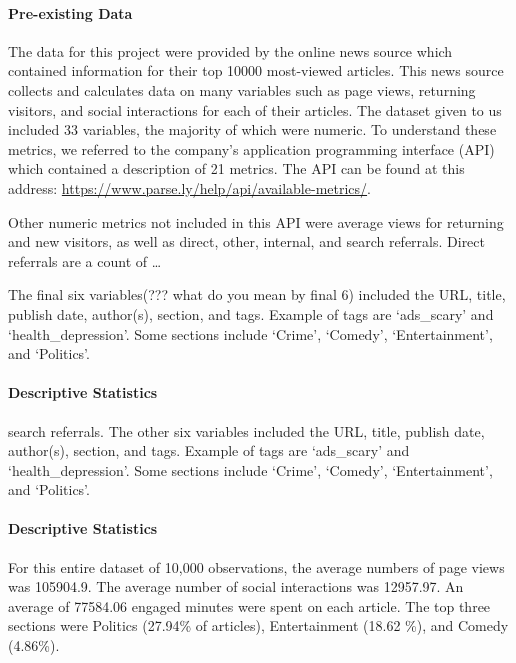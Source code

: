 \documentclass[10pt,letterpaper]{article}
\begin{document}
\hypertarget{pre-existing-data}{%
\paragraph{Pre-existing Data}\label{pre-existing-data}}

The data for this project were provided by the online news source which
contained information for their top 10000 most-viewed articles. This
news source collects and calculates data on many variables such as page
views, returning visitors, and social interactions for each of their
articles. The dataset given to us included 33 variables, the majority of
which were numeric. To understand these metrics, we referred to the
company's application programming interface (API) which contained a
description of 21 metrics. The API can be found at this address:
\url{https://www.parse.ly/help/api/available-metrics/}.

Other numeric metrics not included in this API were average views for
returning and new visitors, as well as direct, other, internal, and
search referrals. Direct referrals are a count of \ldots{}

The final six variables(??? what do you mean by final 6) included the
URL, title, publish date, author(s), section, and tags. Example of tags
are `ads\_scary' and `health\_depression'. Some sections include
`Crime', `Comedy', `Entertainment', and `Politics'.

\paragraph{Descriptive Statistics}\label{descriptive-statistics}
search referrals. The other six variables included the URL, title,
publish date, author(s), section, and tags. Example of tags are
`ads\_scary' and `health\_depression'. Some sections include `Crime',
`Comedy', `Entertainment', and `Politics'.

\hypertarget{descriptive-statistics}{%
\paragraph{Descriptive Statistics}\label{descriptive-statistics}}

For this entire dataset of 10,000 observations, the average numbers of
page views was 105904.9. The average number of social interactions was
12957.97. An average of 77584.06 engaged minutes were spent on each
article. The top three sections were Politics (27.94\% of articles),
Entertainment (18.62 \%), and Comedy (4.86\%).
\end{document}
